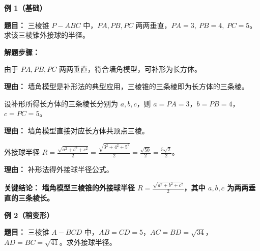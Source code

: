 \begin{examplebox}
	\textbf{\textcolor{CExample}{例 1（基础）}}

	\textbf{\textcolor{CExample}{题目：}}
	三棱锥 $P-ABC$ 中，$PA,PB,PC$ 两两垂直，$PA=3,\ PB=4,\ PC=5$。求该三棱锥外接球的半径。

	\textbf{\textcolor{CExample}{解题步骤：}}
	\begin{description}[style=nextline, leftmargin=2.8em, labelsep=0.5em, itemsep=0.45em]
		\item[\textbf{第一步（识别模型）：}] 由于 $PA,PB,PC$ 两两垂直，符合墙角模型，可补形为长方体。
			\par\textbf{理由：} 墙角模型是补形法的典型应用，三棱锥的三条棱即为长方体的三条棱。
		\item[\textbf{第二步（确定棱长）：}] 设补形所得长方体的三条棱长分别为 $a,b,c$，则 $a=PA=3$，$b=PB=4$，$c=PC=5$。
			\par\textbf{理由：} 墙角模型直接对应长方体共顶点三棱。
		\item[\textbf{第三步（代入公式）：}] 外接球半径 $R = \frac{\sqrt{a^{2}+b^{2}+c^{2}}}{2} = \frac{\sqrt{3^{2}+4^{2}+5^{2}}}{2} = \frac{\sqrt{50}}{2} = \frac{5\sqrt{2}}{2}$。
			\par\textbf{理由：} 补形法得外接球半径公式。
	\end{description}

	\textbf{\textcolor{CExample}{关键结论：}}
	\textbf{墙角模型三棱锥的外接球半径 $R = \frac{\sqrt{a^{2}+b^{2}+c^{2}}}{2}$，其中 $a,b,c$ 为两两垂直的三条棱长。}

	\medskip
	\textbf{\textcolor{CExample}{例 2（稍变形）}}

	\textbf{\textcolor{CExample}{题目：}}
	三棱锥 $A-BCD$ 中，$AB=CD=5$，$AC=BD=\sqrt{34}$，$AD=BC=\sqrt{41}$。求外接球半径。


\end{examplebox}
